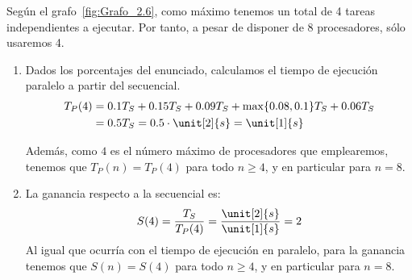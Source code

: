 \begin{ejercicio}
    Según el grafo~\ref{fig:Grafo_2.6}, como máximo tenemos un total de 4 tareas independientes a ejecutar. Por tanto, a pesar de disponer de 8 procesadores, sólo usaremos 4.

    \begin{enumerate}
        \item Dados los porcentajes del enunciado, calculamos el tiempo de ejecución paralelo a partir del secuencial.
            \begin{align*}
                T_P(4) &= 0.1T_S + 0.15T_S + 0.09T_S + \max\{0.08, 0.1\}T_S + 0.06T_S \\
                       &= 0.5T_S = 0.5\cdot \unit[2]{s} = \unit[1]{s}
            \end{align*}

            Además, como $4$ es el número máximo de procesadores que emplearemos, tenemos que
            $T_P(n) = T_P(4)$ para todo $n\geq 4$, y en particular para $n=8$.
        \item La ganancia respecto a la secuencial es:
            \begin{equation*}
                S(4) = \dfrac{T_S}{T_P(4)} = \dfrac{\unit[2]{s}}{\unit[1]{s}} = 2
            \end{equation*}
            Al igual que ocurría con el tiempo de ejecución en paralelo, para la ganancia tenemos que
            $S(n) = S(4)$ para todo $n\geq 4$, y en particular para $n=8$.
    \end{enumerate}

\end{ejercicio}

